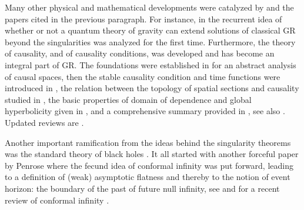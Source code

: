 \documentclass[12pt]{iopart}
\begin{document}
Many other physical and mathematical developments were catalyzed by \cite{P} and the papers cited in the previous paragraph. For instance, in \cite{dW} the recurrent idea of whether or not a quantum theory of gravity can extend solutions of classical GR beyond the singularities was analyzed for the first time. Furthermore, the theory of causality, and of causality conditions, was developed and has become an integral part  of GR. The foundations were established in \cite{KrP} for an abstract analysis of causal spaces, then the stable causality condition and time functions were introduced in \cite{H}, the relation between the topology of spatial sections and causality studied in \cite{Ge}, the basic properties of domain of dependence and global hyperbolicity given in \cite{Ge3}, and a comprehensive summary provided in \cite{Ca}, see also \cite{Ge4}. Updated  reviews are \cite{GS,MSa}.

Another important ramification from the ideas behind the singularity theorems was the standard theory of black holes \cite{H4}. It all started with another forceful paper by Penrose \cite{P0} where the fecund idea of conformal infinity was put forward, leading to a definition of (weak) asymptotic flatness \cite{P3} and thereby to the notion of event horizon: the boundary of the past of future null infinity, see \cite{Ge4,HE,P5,PR1,PR2} and for a recent review of conformal infinity \cite{Fra}.
\end{document}
